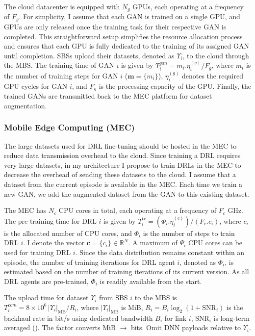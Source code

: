 \documentclass[letterpaper%
, twoside%
, 12pt%
,memoire%
, english%
,creativecommons,hyperref, withAlgo2e %
]{thETS}
\numberwithin{algorithm}{chapter}
\begin{document}
 
 The cloud datacenter is equipped with $N_g$ GPUs, each operating at a frequency of $F_g$. For simplicity, I assume that each GAN is trained on a single GPU, and GPUs are only released once the training task for their respective GAN is completed. This straightforward setup simplifies the resource allocation process and ensures that each GPU is fully dedicated to the training of its assigned GAN until completion. SBSs upload their datasets, denoted as $\Upsilon_i$, to the cloud through the MBS. The training time of GAN $i$ is given by $T_{i}^{gan} = m_i.\eta_i^{(g)}/F_g$, where $m_i$ is the number of training steps for GAN $i$ ($\mathbf{m} = \{m_i\}$), $\eta_i^{(g)}$ denotes the required GPU cycles for GAN $i$, and $F_g$ is the processing capacity of the GPU. Finally, the trained GANs are transmitted back to the MEC platform for dataset augmentation.



\subsubsection{Mobile Edge Computing (MEC)}

The large datasets used for DRL fine-tuning should be hosted in the MEC to reduce data transmission overhead to the cloud. Since training a DRL requires very large datasets, in my  architecture I propose to train DRLs in the MEC to decrease the overhead of sending these datasets to the cloud. I assume that a dataset from the current episode is available in the MEC. Each time we train a new GAN, we add the augmented dataset from the GAN to this existing dataset. 



The MEC has $N_c$ CPU cores in total, each operating at a frequency of $F_c$ GHz. The pre-training time for DRL $i$ is given by $T_{i}^{tr} = (\Phi_i.\eta_i^{(c)})/(F_c . c_{i})$, where $c_i$ is the allocated number of CPU cores, and $\Phi_i$ is the number of steps to train DRL $i$. I denote the vector $\mathbf{c} = \{c_i\} \in \mathbb{R}^N$. A maximum of $\Psi_i$ CPU cores can be used for training DRL $i$. Since the data distribution remains constant within an episode, the number of training iterations for DRL agent $i$, denoted as $\Phi_i$, is estimated based on the number of training iterations of its current version. As all DRL agents are pre-trained, $\Phi_i$ is readily available from the start.


 The upload time for dataset $\Upsilon_i$ from SBS $i$ to the MBS is \(T_i^{com} = 8\times 10^{6}\,\lvert\Upsilon_i\rvert_{\mathrm{MB}} / R_i\), where \(\lvert\Upsilon_i\rvert_{\mathrm{MB}}\) is MiB, \(R_i=B_i\log_{2}(1+\mathrm{SNR}_i)\) is the backhaul rate in bit/s using dedicated bandwidth \(B_i\) for link \(i\), \(\mathrm{SNR}_i\) is long-term averaged (\cite{xie2023edge}). The factor converts MiB \(\rightarrow\) bits. Omit DNN payloads relative to \(\Upsilon_i\).
\end{document}
